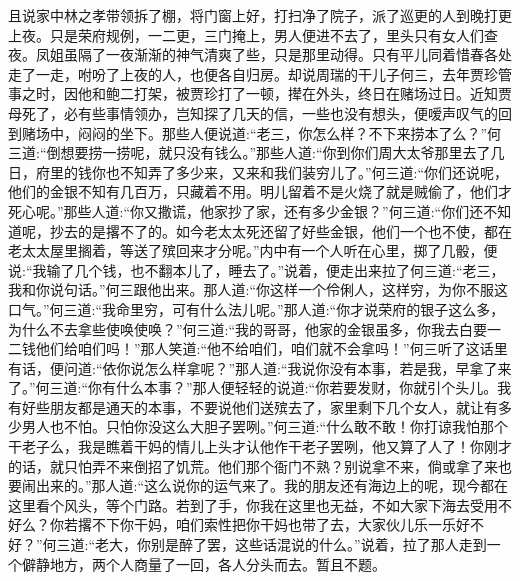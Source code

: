 \begin{parag}
    且说家中林之孝带领拆了棚，将门窗上好，打扫净了院子，派了巡更的人到晚打更上夜。只是荣府规例，一二更，三门掩上，男人便进不去了，里头只有女人们查夜。凤姐虽隔了一夜渐渐的神气清爽了些，只是那里动得。只有平儿同着惜春各处走了一走，咐吩了上夜的人，也便各自归房。却说周瑞的干儿子何三，去年贾珍管事之时，因他和鲍二打架，被贾珍打了一顿，撵在外头，终日在赌场过日。近知贾母死了，必有些事情领办，岂知探了几天的信，一些也没有想头，便嗳声叹气的回到赌场中，闷闷的坐下。那些人便说道:“老三，你怎么样？不下来捞本了么？”何三道:“倒想要捞一捞呢，就只没有钱么。”那些人道:“你到你们周大太爷那里去了几日，府里的钱你也不知弄了多少来，又来和我们装穷儿了。”何三道:“你们还说呢，他们的金银不知有几百万，只藏着不用。明儿留着不是火烧了就是贼偷了，他们才死心呢。”那些人道:“你又撒谎，他家抄了家，还有多少金银？”何三道:“你们还不知道呢，抄去的是撂不了的。如今老太太死还留了好些金银，他们一个也不使，都在老太太屋里搁着，等送了殡回来才分呢。”内中有一个人听在心里，掷了几骰，便说:“我输了几个钱，也不翻本儿了，睡去了。”说着，便走出来拉了何三道:“老三，我和你说句话。”何三跟他出来。那人道:“你这样一个伶俐人，这样穷，为你不服这口气。”何三道:“我命里穷，可有什么法儿呢。”那人道:“你才说荣府的银子这么多，为什么不去拿些使唤使唤？”何三道:“我的哥哥，他家的金银虽多，你我去白要一二钱他们给咱们吗！”那人笑道:“他不给咱们，咱们就不会拿吗！”何三听了这话里有话，便问道:“依你说怎么样拿呢？”那人道:“我说你没有本事，若是我，早拿了来了。”何三道:“你有什么本事？”那人便轻轻的说道:“你若要发财，你就引个头儿。我有好些朋友都是通天的本事，不要说他们送殡去了，家里剩下几个女人，就让有多少男人也不怕。只怕你没这么大胆子罢咧。”何三道:“什么敢不敢！你打谅我怕那个干老子么，我是瞧着干妈的情儿上头才认他作干老子罢咧，他又算了人了！你刚才的话，就只怕弄不来倒招了饥荒。他们那个衙门不熟？别说拿不来，倘或拿了来也要闹出来的。”那人道:“这么说你的运气来了。我的朋友还有海边上的呢，现今都在这里看个风头，等个门路。若到了手，你我在这里也无益，不如大家下海去受用不好么？你若撂不下你干妈，咱们索性把你干妈也带了去，大家伙儿乐一乐好不好？”何三道:“老大，你别是醉了罢，这些话混说的什么。”说着，拉了那人走到一个僻静地方，两个人商量了一回，各人分头而去。暂且不题。
\end{parag}


